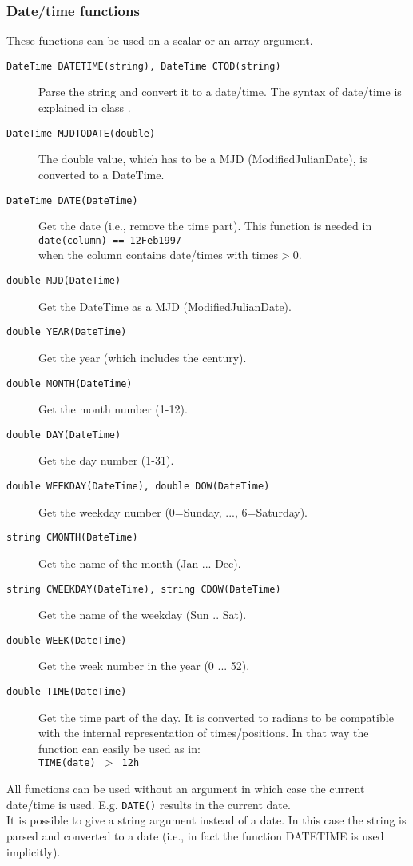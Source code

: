 \subsubsection{Date/time functions}
These functions can be used on a scalar or an array argument.
\begin{description}
  \item[ \texttt{DateTime DATETIME(string),  DateTime CTOD(string)} ]
       Parse the string and convert it to a date/time. The syntax of
       date/time is explained in class
       .
  \item[ \texttt{DateTime MJDTODATE(double)} ]
       The double value, which has to be a MJD (ModifiedJulianDate), is
       converted to a DateTime.
  \item[ \texttt{DateTime DATE(DateTime)}]
        Get the date (i.e., remove the time part). This function is needed in
       \\\texttt{date(column) == 12Feb1997}
       \\when the column contains date/times with times$>$0.
  \item[ \texttt{double MJD(DateTime)}]
        Get the DateTime as a MJD (ModifiedJulianDate).
  \item[ \texttt{double YEAR(DateTime)}]
        Get the year (which includes the century).
  \item[ \texttt{double MONTH(DateTime)}]
        Get the month number (1-12).
  \item[ \texttt{double DAY(DateTime)}]
        Get the day number (1-31).
  \item[ \texttt{double WEEKDAY(DateTime),  double DOW(DateTime)}]
        Get the weekday number (0=Sunday, ..., 6=Saturday).
  \item[ \texttt{string CMONTH(DateTime)}]
        Get the name of the month (Jan ... Dec).
  \item[ \texttt{string CWEEKDAY(DateTime),  string CDOW(DateTime)}]
        Get the name of the weekday (Sun .. Sat).
  \item[ \texttt{double WEEK(DateTime)}]
        Get the week number in the year (0 ... 52).
  \item[ \texttt{double TIME(DateTime)}]
       Get the time part of the day. It is converted to radians to
       be compatible with the internal representation of times/positions.
       In that way the function can easily be used as in:
       \\\texttt{TIME(date) $>$ 12h}
\end{description}
All functions can be used without an argument in which case the current
date/time is used. E.g. \texttt{DATE()} results in the current date.
\\It is possible to give a string argument instead of a date. In this
case the string is parsed and converted to a date (i.e., in fact the
function DATETIME is used implicitly).

